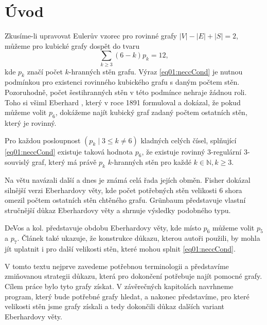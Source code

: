\chapter*{Úvod}

Zkusíme-li upravovat Eulerův vzorec pro rovinné grafy
$|V|-|E|+|S|=2$, můžeme pro kubické grafy dospět do tvaru 
\begin{equation}\label{eq01:neccCond}
\sum_{k \geq 3}{(6-k)p_k}=12,
\end{equation}
kde $p_k$ značí počet $k$-hranných stěn grafu. Výraz \eqref{eq01:neccCond} je nutnou podmínkou pro existenci rovinného kubického grafu s daným počtem stěn. Pozoruhodně, počet šestihranných stěn v této podmínce nehraje žádnou roli. Toho si všiml Eberhard \cite{Eberhard91}, který v roce 1891 formuloval a dokázal, že pokud můžeme volit $p_6$, dokážeme najít kubický graf zadaný počtem ostatních stěn, který je rovinný.

\begin{veta}\label{veta:Eberhard}
Pro každou posloupnost $(p_k \mid 3 \leq k \neq 6)$ kladných celých čísel, splňující \eqref{eq01:neccCond} existuje taková hodnota $p_6$, že existuje rovinný 3-regulární 3-souvislý graf, který má právě $p_k$ $k$-hranných stěn pro každé $k \in \mathbb{N}, k \geq 3 $.
\end{veta}

Na větu navázali další a dnes je známá celá řada jejích obměn. Fisher \citep{Fisher74} dokázal silnější verzi Eberhardovy věty, kde počet potřebných stěn velikosti 6 shora omezil počtem ostatních stěn chtěného grafu. Grünbaum \citep{Grunbaum} představuje vlastní stručnější důkaz Eberhardovy věty a shrnuje výsledky podobného typu. 

DeVos a kol. \citep{Samal09} představuje obdobu Eberhardovy věty, kde místo $p_6$ můžeme volit $p_5$ a $p_7$. Článek také ukazuje, že konstrukce důkazu, kterou autoři použili, by mohla jít uplatnit i pro další velikosti stěn, které mohou splnit \eqref{eq01:neccCond}. 

V tomto textu nejprve zavedeme potřebnou terminologii a představíme zmiňovanou strategii důkazu, která pro dokončení potřebuje najít pomocné grafy. Cílem práce bylo tyto grafy získat. V závěrečných kapitolách navrhneme program, který bude potřebné grafy hledat, a nakonec představíme, pro které velikosti stěn jsme grafy získali a tedy dokončili důkaz dalších variant Eberhardovy věty.
